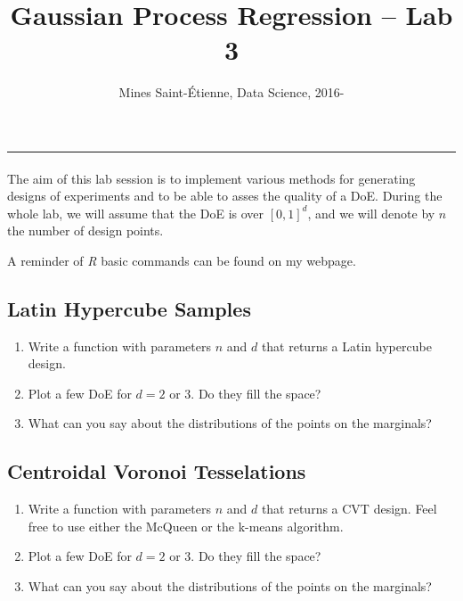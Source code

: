 \documentclass[11pt]{scrartcl}
\title{Gaussian Process Regression -- Lab 3}
\author{Mines Saint-\'Etienne, Data Science,  2016\:-\:2017 }
\date{}
\begin{document}
\maketitle
\vspace{-1cm}
\hrule
\vspace{5mm}

\paragraph{}
The aim of this lab session is to implement various methods for generating designs of experiments and to be able to asses the quality of a DoE. During the whole lab, we will assume that the DoE is over $[0,1]^d$, and we will denote by $n$ the number of design points.

A reminder of \emph{R} basic commands can be found on my webpage. 

\subsection*{Latin Hypercube Samples}

\begin{enumerate}[label = Q \arabic*.]
	\item Write a function with parameters $n$ and $d$ that returns a Latin hypercube design.
	\item Plot a few DoE for $d=2$ or $3$. Do they fill the space? 
	\item What can you say about the distributions of the points on the marginals?
\end{enumerate}

\subsection*{Centroidal Voronoi Tesselations}

\begin{enumerate}[label = Q \arabic*., resume]
	\item Write a function with parameters $n$ and $d$ that returns a CVT design. Feel free to use either the McQueen or the k-means algorithm.
	\item Plot a few DoE for $d=2$ or $3$. Do they fill the space? 
	\item What can you say about the distributions of the points on the marginals?
\end{enumerate}
\end{document}
